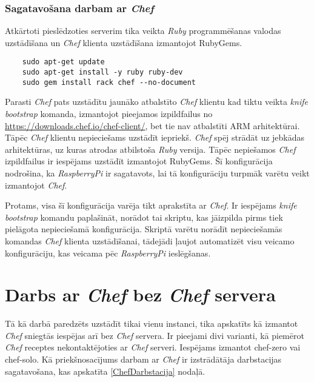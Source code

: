 \subsubsection{Sagatavošana darbam ar \textit{Chef}}
Atkārtoti pieslēdzoties serverim tika veikta \textit{Ruby} programmēšanas valodas uzstādīšana un \textit{Chef} klienta uzstādīšana izmantojot RubyGems.
\begin{lstlisting}
	sudo apt-get update
	sudo apt-get install -y ruby ruby-dev
	sudo gem install rack chef --no-document
\end{lstlisting}
Parasti \textit{Chef} pats uzstādītu jaunāko atbalstīto \textit{Chef} klientu kad tiktu veikta \textit{knife bootstrap} komanda, izmantojot pieejamos izpildfailus no \url{https://downloads.chef.io/chef-client/}, bet tie nav atbalstīti ARM arhitektūrai. Tāpēc \textit{Chef} klientu nepieciešams uzstādīt iepriekš. \textit{Chef} spēj strādāt uz jebkādas arhitektūras, uz kuras atrodas atbilstoša \textit{Ruby} versija. Tāpēc nepiešamos \textit{Chef} izpildfailus ir iespējams uzstādīt izmantojot RubyGems. Šī konfigurācija nodrošina, ka \textit{RaspberryPi} ir sagatavots, lai tā konfigurāciju turpmāk varētu veikt izmantojot \textit{Chef}.

Protams, visa šī konfigurācija varēja tikt aprakstīta ar \textit{Chef}. Ir iespējams \textit{knife bootstrap} komandu paplašināt, norādot tai skriptu, kas jāizpilda pirms tiek pielāgota nepieciešamā konfigurācija. Skriptā varētu norādīt nepieciešamās komandas \textit{Chef} klienta uzstādīšanai, tādejādi ļaujot automatizēt visu veicamo konfigurāciju, kas veicama pēc \textit{RaspberryPi} ieslēgšanas.


\section{Darbs ar \textit{Chef} bez \textit{Chef} servera}
Tā kā darbā paredzēts uzstādīt tikai vienu instanci, tika apskatīts kā izmantot \textit{Chef} sniegtās iespējas arī bez \textit{Chef} servera. Ir pieejami divi varianti, kā piemērot \textit{Chef} receptes nekontaktējoties ar \textit{Chef} serveri. Iespējams izmantot chef-zero vai chef-solo.
Kā priekšnosacījums darbam ar \textit{Chef} ir izstrādātāja darbstacijas sagatavošana, kas apskatīta \ref{ChefDarbstacija} nodaļā.
